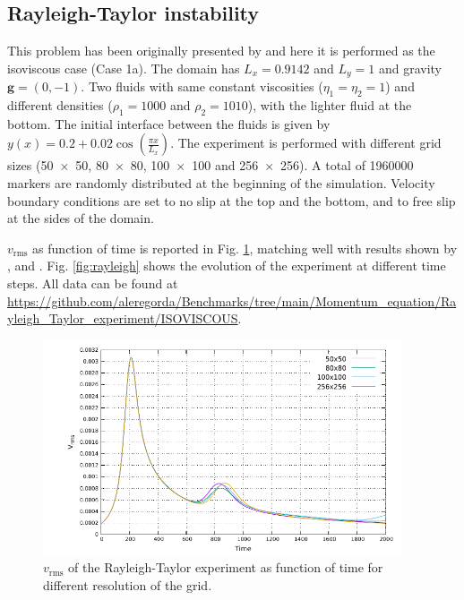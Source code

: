 \documentclass[hidelinks,10pt,a4paper]{article}
\begin{document}
\subsection{Rayleigh-Taylor instability}\label{sec:rayleigh}
This problem has been originally presented by \citet{vanKeken1997} and here it is performed as the isoviscous case (Case 1a). The domain has $L_x=0.9142$ and
$L_y=1$ and gravity $\bm{g}=(0,-1)$. Two fluids with same constant viscosities ($\eta_1=\eta_2=1$) and different densities ($\rho_1=1000$ and $\rho_2=1010$),
with the lighter fluid at the bottom. The initial interface between the fluids is given by $y(x)=0.2+0.02 \cos \left(\frac{\pi x}{L_x}\right)$. The experiment
is performed with different grid sizes (\num{50x50}, \num{80x80}, \num{100x100} and \num{256x256}). A total of 1960000 markers are randomly distributed at the
beginning of the simulation. Velocity boundary conditions are set to no slip at the top and the bottom, and to free slip at the sides of the domain.

$v_{\textrm{rms}}$ as function of time is reported in Fig. \ref{fig:RT}, matching well with results shown by \citet{vanKeken1997}, \citet{Tackley2003} and
\citet{Thieulot2014}. Fig. \ref{fig:rayleigh} shows the evolution of the experiment at different time steps. All data can be found at 
\url{https://github.com/aleregorda/Benchmarks/tree/main/Momentum_equation/Rayleigh_Taylor_experiment/ISOVISCOUS}.

\begin{figure}
\centering
\noindent\includegraphics[width=400px]{./Figures/RT.pdf}
\caption{$v_{\textrm{rms}}$ of the Rayleigh-Taylor experiment as function of time for different resolution of the grid.}
\label{fig:RT}
\end{figure}
\end{document}
